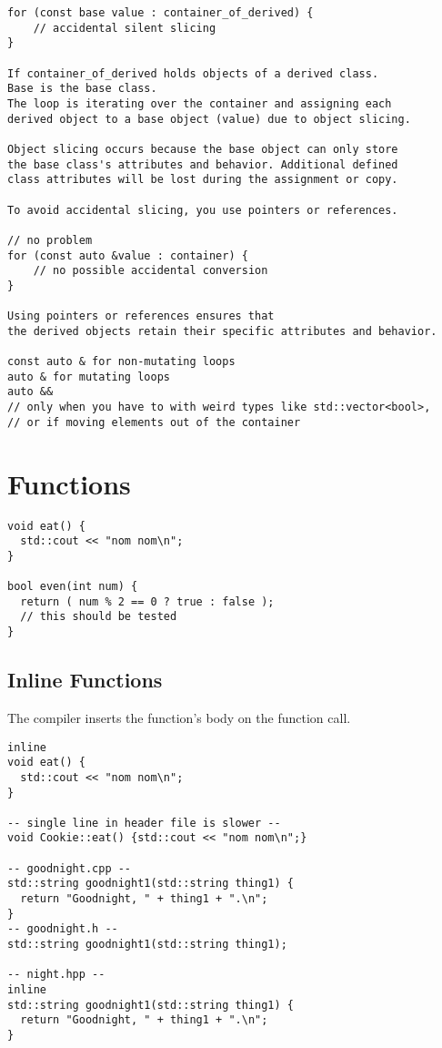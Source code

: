 \begin{verbatim}
for (const base value : container_of_derived) {
    // accidental silent slicing
}

If container_of_derived holds objects of a derived class. 
Base is the base class.
The loop is iterating over the container and assigning each
derived object to a base object (value) due to object slicing.

Object slicing occurs because the base object can only store
the base class's attributes and behavior. Additional defined 
class attributes will be lost during the assignment or copy.

To avoid accidental slicing, you use pointers or references.

// no problem
for (const auto &value : container) {
    // no possible accidental conversion
}

Using pointers or references ensures that 
the derived objects retain their specific attributes and behavior.

const auto & for non-mutating loops
auto & for mutating loops
auto && 
// only when you have to with weird types like std::vector<bool>,
// or if moving elements out of the container
\end{verbatim}

\section{Functions}

\begin{verbatim}
void eat() {
  std::cout << "nom nom\n";
}

bool even(int num) {
  return ( num % 2 == 0 ? true : false );
  // this should be tested
}
\end{verbatim}

\subsection{Inline Functions}

The compiler inserts the function’s body on the function call.

\begin{verbatim}
inline 
void eat() {
  std::cout << "nom nom\n";
}

-- single line in header file is slower --
void Cookie::eat() {std::cout << "nom nom\n";}

-- goodnight.cpp --
std::string goodnight1(std::string thing1) {
  return "Goodnight, " + thing1 + ".\n";
}
-- goodnight.h --
std::string goodnight1(std::string thing1);

-- night.hpp -- 
inline
std::string goodnight1(std::string thing1) {
  return "Goodnight, " + thing1 + ".\n";
}
\end{verbatim}

